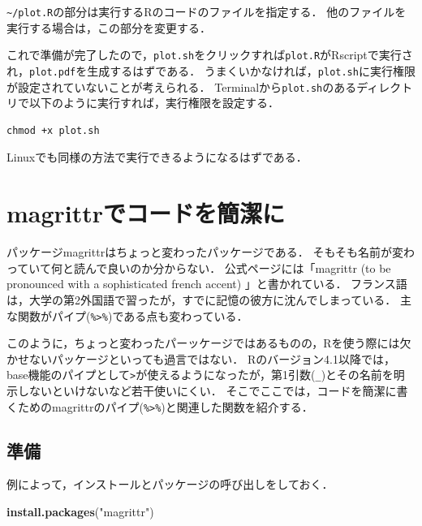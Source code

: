 \documentclass[
]{article}
\newenvironment{Shaded}{\begin{snugshade}}{\end{snugshade}}
\newcommand{\FunctionTok}[1]{\textcolor[rgb]{0.13,0.29,0.53}{\textbf{#1}}}
\newcommand{\NormalTok}[1]{#1}
\newcommand{\StringTok}[1]{\textcolor[rgb]{0.31,0.60,0.02}{#1}}
\begin{document}
\texttt{\textasciitilde{}/plot.R}の部分は実行するRのコードのファイルを指定する．
他のファイルを実行する場合は，この部分を変更する．

これで準備が完了したので，\texttt{plot.sh}をクリックすれば\texttt{plot.R}がRscriptで実行され，\texttt{plot.pdf}を生成するはずである．
うまくいかなければ，\texttt{plot.sh}に実行権限が設定されていないことが考えられる．
Terminalから\texttt{plot.sh}のあるディレクトリで以下のように実行すれば，実行権限を設定する．

\begin{verbatim}
chmod +x plot.sh
\end{verbatim}

Linuxでも同様の方法で実行できるようになるはずである．

\hypertarget{magrittr}{%
\section{magrittrでコードを簡潔に}\label{magrittr}}

パッケージmagrittrはちょっと変わったパッケージである．
そもそも名前が変わっていて何と読んで良いのか分からない．
公式ページには「magrittr (to be pronounced with a sophisticated french accent) 」と書かれている．
フランス語は，大学の第2外国語で習ったが，すでに記憶の彼方に沈んでしまっている．
主な関数がパイプ(\texttt{\%\textgreater{}\%})である点も変わっている．

このように，ちょっと変わったパーッケージではあるものの，Rを使う際には欠かせないパッケージといっても過言ではない．
Rのバージョン4.1以降では，base機能のパイプとして\texttt{\textbar{}\textgreater{}}が使えるようになったが，第1引数(\texttt{\_})とその名前を明示しないといけないなど若干使いにくい．
そこでここでは，コードを簡潔に書くためのmagrittrのパイプ(\texttt{\%\textgreater{}\%})と関連した関数を紹介する．

\hypertarget{ux6e96ux5099}{%
\subsection{準備}\label{ux6e96ux5099}}

例によって，インストールとパッケージの呼び出しをしておく．

\begin{Shaded}
\begin{Highlighting}[]
\FunctionTok{install.packages}\NormalTok{(}\StringTok{"magrittr"}\NormalTok{)}
\end{Highlighting}
\end{Shaded}
\end{document}
